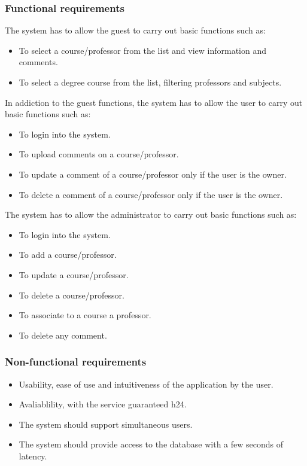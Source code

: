 \documentclass[a4paper, oneside]{article}
\begin{document}
\subsubsection{Functional requirements}
The system has to allow the guest to carry out basic functions such as:
\begin{itemize}
\item To select a course/professor from the list and view information and comments.
\item To select a degree course from the list, filtering professors and subjects.
\end{itemize}
In addiction to the guest functions, the system has to allow the user to carry out basic functions such as:
\begin{itemize}
\item To login into the system.
\item To upload comments on a course/professor.
\item To update a comment of a course/professor only if the user is the owner.
\item To delete a comment of a course/professor only if the user is the owner.
\end{itemize}
\vspace{2mm}
The system has to allow the administrator to carry out basic functions such as:
\begin{itemize}
\item To login into the system.
\item To add a course/professor.
\item To update a course/professor.
\item To delete a course/professor.
\item To associate to a course a professor.
\item To delete any comment.
\end{itemize}
\vspace{2mm}

\subsubsection{Non-functional requirements}
\begin{itemize}
\item Usability, ease of use and intuitiveness of the application by the user.
\item Avaliablility, with the service guaranteed h24.
\item The system should support simultaneous users.
\item The system should provide access to the database with a few seconds of latency.
\end{itemize}
\end{document}
